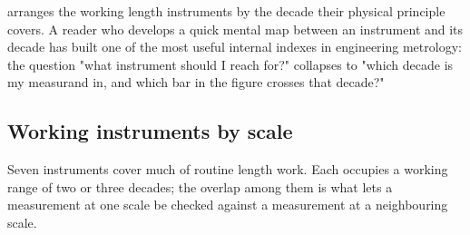 

 arranges the working length
instruments by the decade their physical principle covers. A reader
who develops a quick mental map between an instrument and its decade
has built one of the most useful internal indexes in engineering
metrology: the question "what instrument should I reach for?"
collapses to "which decade is my measurand in, and which bar in the
figure crosses that decade?"

\subsection{Working instruments by scale}

Seven instruments cover much of routine length work. Each occupies a
working range of two or three decades; the overlap among them is what
lets a measurement at one scale be checked against a measurement at a
neighbouring scale.

